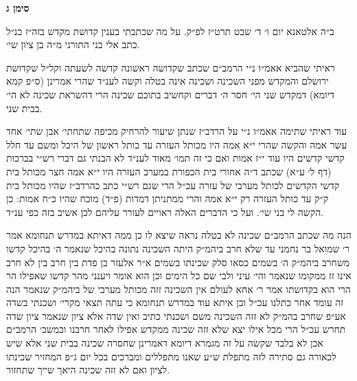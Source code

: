 \documentclass[12pt, openany]{book}
\newcommand{\chapname}{}
\newcommand{\newchap}[1]{
	\addcontentsline{toc}{chapter}{#1}
	\renewcommand{\chapname}{#1}
		\begin{center}
			\textbf{%
\fontsize{16pt}{16pt}\selectfont
				#1}
		\end{center}
}
\begin{document}
\newchap{סימן ג}
\begin{multicols}{2}
ב״ה אלטאנא יום ו׳ ד׳ שבט תרט״ז לפ״ק. על מה שכתבתי בענין קדושת מקדש בזה״ז כנ״ל כתב אלי בני התורני מ״ה בן ציון שי׳.\\\vspace{0pt}

ראיתי שהביא אאמ״ו נ״י הרמב״ם שכתב שקדושה ראשונה קדשה לשעתה וקל״ל שקדושת ירושלם והמקדש מפני השכינה ושכינה אינה בטלה וקשה לענ״ד שהרי אמרינן (ס״פ קמא דיומא) דמקדש שני הי׳ חסר ה׳ דברים וקחשיב בתוכם שכינה הרי דהשראת שכינה לא הי׳ בבית שני.\\\vspace{0pt}

עוד ראיתי שתימה אאמ״ו נ״י על הרדב״ז שנתן שיעור להרחיק מכיפה שתחתי׳ אבן שתי׳ אחד עשר אמה והקשה שהרי י״א אמה היו מכותל העזרה עד כותל ראשון של היכל ומשם עד חלל קדשי קדשים היו עוד י״ז אמות ואם כי זה תמו׳ מאוד לענ״ד לא הבנתי גם דברי רש״י בברכות (דף ל׳ ע״א) שכתב ד״ה אחורי בית הכפורת במערב העזרה היו י״א אמה חצר מכותל בית קדשי הקדשים לכותל מערבי של עזרה עכ״ל הרי שגם רש״י כתב כהרדב״ז שהיו מכותל בית ק״ק עד כותל העזרה רק י״א אמה והרי ממתניתן דמדות (פ״ד) מוכח שהיו כ״ח אמות: כן הקשה לי בני שי׳. ועל כי הדברים האלה ראויים לעורר עליהם לכן אשיב בזה כפי ענ״ד.\\\vspace{0pt}

הנה מה שכתב הרמב״ם שכינה לא בטלה נראה שיצא לו כן ממה דאיתא במדרש תנחומא אמר ר׳ שמואל בר נחמני עד שלא חרב ביהמ״ק היתה השכינה נתונה בהיכל שנאמר ה׳ בהיכל קדשו משחרב ביהמ״ק ה׳ בשמים כסאו סלק שכינתו בשמים א״ר אלעזר בן פדת בין חרב בין לא חרב אינו זז ממקומו שנאמר והי׳ עיני ולבי שם כל הימים וכן הוא אומר ויענני מהר קדשו שאפילו הר הרי הוא בקדושתו אמר ר׳ אחא לעולם אין השכינה זזה מכותל מערבי של ביהמ״ק שנאמר הנה זה עומד אחר כתלנו עכ״ל וכן איתא עוד במדרש תנחומא כי עתה תצאי מקרי׳ ושכנתי בשדה אע״פ שחרב בהמ״ק לא זזה השכינה משם ושכנתי כתיב ואין שדה אלא ציון שנאמר ציון שדה תחרש עכ״ל הרי מכל אילו יצא שלא זזה שכינה ממקדש אפילו לאחר חרבנו וכמשכ׳ הרמב״ם אכן לא בלבד שקשה על זה מגמרא דיומא דאמרינן שחסרה שכינה בבית שני אלא שיש לכאורה גם סתירה לזה מתפלת ש״ע שאנו מתפללים ומברכים בכל יום ג״פ המחזיר שכינתו לציון ואם לא זזה שכינה היאך שייך שתחזור.\\\vspace{0pt}


\end{multicols}
\end{document}
